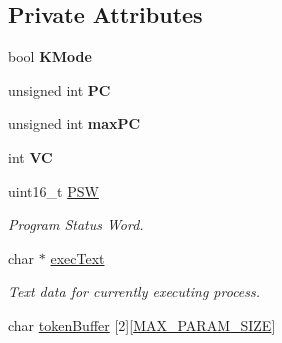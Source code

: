 \subsection*{\-Private \-Attributes}
\begin{DoxyCompactItemize}
\item 
\hypertarget{classcCPU_af1d6fd5349bde1621595f6c1422792b4}{bool {\bfseries \-K\-Mode}}\label{d2/dc6/classcCPU_af1d6fd5349bde1621595f6c1422792b4}

\item 
\hypertarget{classcCPU_a982f4af913ec39928e62129200c21e58}{unsigned int {\bfseries \-P\-C}}\label{d2/dc6/classcCPU_a982f4af913ec39928e62129200c21e58}

\item 
\hypertarget{classcCPU_af6d922807d65a8a39722dde518febc52}{unsigned int {\bfseries max\-P\-C}}\label{d2/dc6/classcCPU_af6d922807d65a8a39722dde518febc52}

\item 
\hypertarget{classcCPU_aae9fc88ce939489754ac776b6447607b}{int {\bfseries \-V\-C}}\label{d2/dc6/classcCPU_aae9fc88ce939489754ac776b6447607b}

\item 
\hypertarget{classcCPU_a52457b3189761c2f07c9fb12169dad50}{uint16\-\_\-t \hyperlink{classcCPU_a52457b3189761c2f07c9fb12169dad50}{\-P\-S\-W}}\label{d2/dc6/classcCPU_a52457b3189761c2f07c9fb12169dad50}

\begin{DoxyCompactList}\small\item\em \-Program \-Status \-Word. \end{DoxyCompactList}\item 
\hypertarget{classcCPU_ad50800fe39f7f8d51dc7095e441db94a}{char $\ast$ \hyperlink{classcCPU_ad50800fe39f7f8d51dc7095e441db94a}{exec\-Text}}\label{d2/dc6/classcCPU_ad50800fe39f7f8d51dc7095e441db94a}

\begin{DoxyCompactList}\small\item\em \-Text data for currently executing process. \end{DoxyCompactList}\item 
\hypertarget{classcCPU_a06d3e3497a2636740db81fa00641fd88}{char \hyperlink{classcCPU_a06d3e3497a2636740db81fa00641fd88}{token\-Buffer} \mbox{[}2\mbox{]}\mbox{[}\hyperlink{cpu_8h_a9e34e5196b1f8e4c96f229d062c73fe0}{\-M\-A\-X\-\_\-\-P\-A\-R\-A\-M\-\_\-\-S\-I\-Z\-E}\mbox{]}}\label{d2/dc6/classcCPU_a06d3e3497a2636740db81fa00641fd88}


\end{DoxyCompactItemize}
